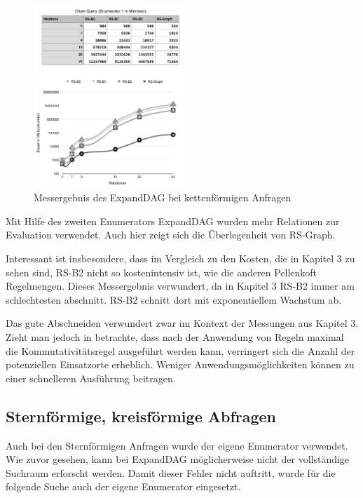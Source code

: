 \begin{figure}[ht]
  \centering
  \includegraphics[width=0.5\textwidth]{05_ResultsEvaluation/00_media/ChainEnumerator2.png}
  \caption{Messergebnis des ExpandDAG bei kettenförmigen Anfragen}
  \label{chainQuery1}
\end{figure}


Mit Hilfe des zweiten Enumerators ExpandDAG wurden mehr Relationen zur Evaluation verwendet. Auch hier zeigt sich die Überlegenheit von RS-Graph.

Interessant ist insbesondere, dass im Vergleich zu den Kosten, die in Kapitel 3 zu sehen sind, RS-B2 nicht so kostenintensiv ist, wie die anderen Pellenkoft Regelmengen. Dieses Messergebnis verwundert, da in Kapitel 3 RS-B2 immer am schlechtesten abschnitt. RS-B2 schnitt dort mit exponentiellem Wachstum ab.

Das gute Abschneiden verwundert zwar im Kontext der Messungen aus Kapitel 3. Zieht man jedoch in betrachte, dass nach der Anwendung von Regeln maximal die Kommutativitätsregel ausgeführt werden kann, verringert sich die Anzahl der potenziellen Einsatzorte erheblich. Weniger Anwendungsmöglichkeiten können zu einer schnelleren Ausführung beitragen.





\subsection{Sternförmige, kreisförmige Abfragen}

Auch bei den Sternförmigen Anfragen wurde der eigene Enumerator verwendet. Wie zuvor gesehen, kann bei ExpandDAG möglicherweise nicht der vollständige Suchraum erforscht werden. Damit dieser Fehler nicht auftritt, wurde für die folgende Suche auch der eigene Enumerator eingesetzt.

